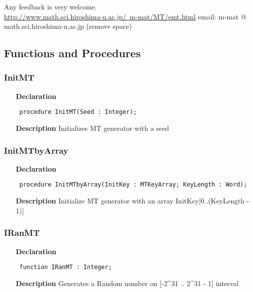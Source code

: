 \documentclass[12pt,a4paper,oneside]{report}
\newcommand{\declarationitem}[1]{\textbf{#1}}
\newcommand{\descriptiontitle}[1]{\textbf{#1}}
\newcommand{\code}[1]{\texttt{#1}}
\begin{document}
Any feedback is very welcome.\\ \href{http://www.math.sci.hiroshima-u.ac.jp/~m-mat/MT/emt.html}{http://www.math.sci.hiroshima-u.ac.jp/~m-mat/MT/emt.html} email: m{-}mat @ math.sci.hiroshima{-}u.ac.jp (remove space) 
\subsection{Functions and Procedures}
\subsubsection{InitMT}
\label{uranmt-InitMT}
\begin{itemize}\item[\declarationitem{Declaration}\hfill]
	\begin{flushleft}
		\code{
			procedure InitMT(Seed : Integer);}
		
	\end{flushleft}
	
	\par
	\item[\descriptiontitle{Description}]
	Initializes MT generator with a seed
	
\end{itemize}
\subsubsection{InitMTbyArray}
\label{uranmt-InitMTbyArray}
\begin{itemize}\item[\declarationitem{Declaration}\hfill]
	\begin{flushleft}
		\code{
			procedure InitMTbyArray(InitKey : MTKeyArray; KeyLength : Word);}
		
	\end{flushleft}
	
	\par
	\item[\descriptiontitle{Description}]
	Initialize MT generator with an array InitKey[0..(KeyLength {-} 1)]
	
\end{itemize}
\subsubsection{IRanMT}
\label{uranmt-IRanMT}
\begin{itemize}\item[\declarationitem{Declaration}\hfill]
	\begin{flushleft}
		\code{
			function IRanMT : Integer;}
		
	\end{flushleft}
	
	\par
	\item[\descriptiontitle{Description}]
	Generates a Random number on [{-}2{\^{}}31 .. 2{\^{}}31 {-} 1] interval
	
\end{itemize}
\end{document}
